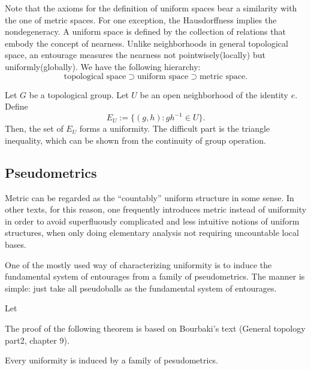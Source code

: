 \documentclass{../crs}
\begin{document}
Note that the axioms for the definition of uniform spaces bear a similarity with the one of metric spaces.
For one exception, the Hausdorffness implies the nondegeneracy.
A uniform space is defined by the collection of relations that embody the concept of nearness.
Unlike neighborhoods in general topological space, an entourage measures the nearness not pointwisely(locally) but uniformly(globally).
We have the following hierarchy:
\[\text{topological space} \supset \text{uniform space} \supset \text{metric space}.\]
\begin{ex}
Let $G$ be a topological group.
Let $U$ be an open neighborhood of the identity $e$.
Define
\[E_U:=\{(g,h):gh^{-1}\in U\}.\]
Then, the set of $E_U$ forms a uniformity.
The difficult part is the triangle inequality, which can be shown from the continuity of group operation.
\end{ex}




\subsection{Pseudometrics}




Metric can be regarded as the ``countably'' uniform structure in some sense. 
In other texts, for this reason, one frequently introduces metric instead of uniformity in order to avoid superfluously complicated and less intuitive notions of uniform structures, when only doing elementary analysis not requiring uncountable local bases.



One of the mostly used way of characterizing uniformity is to induce the fundamental system of entourages from a family of pseudometrics.
The manner is simple: just take all pseudoballs as the fundamental system of entourages.
\begin{defn}
Let 
\end{defn}
The proof of the following theorem is based on Bourbaki's text (General topology part2, chapter 9).

\begin{thm}
Every uniformity is induced by a family of pesudometrics.
\end{thm}
\begin{pf}

\end{pf}
\end{document}
